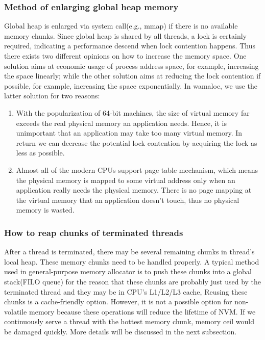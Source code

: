 \documentclass[10pt, conference, compsocconf]{IEEEtran}
\begin{document}
\subsubsection{Method of enlarging global heap memory}
Global heap is enlarged via system call(e.g., mmap) if there is no available memory chunks.
Since global heap is shared by all threads, 
a lock is certainly required, indicating a performance descend when lock contention happens.
Thus there exists two different opinions on how to increase the memory space. 
One solution aims at economic usage of process address space, for example, increasing the space linearly;
while the other solution aims at reducing the lock contention if possible, for example, increasing the space exponentially. 
In wamaloc, we use the latter solution for two reasons: 
\begin{enumerate}
    \item With the popularization of 64-bit machines, the size of virtual memory far exceeds the real physical memory an application needs.
Hence, it is unimportant that an application may take too many virtual memory. 
In return we can decrease the potential lock contention by acquiring the lock as less as possible.
    \item Almost all of the modern CPUs support page table mechanism, 
        which means the physical memory is mapped to some virtual address only when an application really needs the physical memory. 
        There is no page mapping at the virtual memory that an application doesn't touch, thus no physical memory is wasted.
\end{enumerate}

\subsubsection{How to reap chunks of terminated threads}
After a thread is terminated, there may be several remaining chunks in thread's local heap. 
These memory chunks need to be handled properly.
A typical method used in general-purpose memory allocator is to push these chunks into a global stack(FILO queue)
for the reason that these chunks are probably just used by the terminated thread and they may be in CPU's L1/L2/L3 cache, 
Reusing these chunks is a cache-friendly option.
However, it is not a possible option for non-volatile memory because these operations will reduce the lifetime of NVM.
If we continuously serve a thread with the hottest memory chunk, memory ceil would be damaged quickly.
More details will be discussed in the next subsection.
\end{document}
